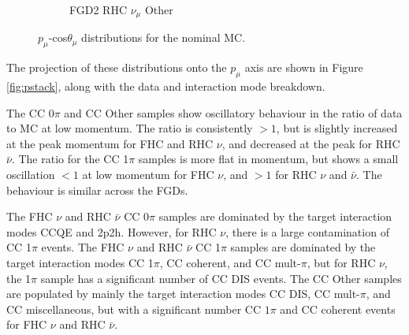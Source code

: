 \begin{figure}
\begin{subfigure}{.32\textwidth}
  \caption{FGD2 RHC $\nu_{\mu}$ Other}
  \label{fig:2d_FGD2_NuMuBkg_CCOther_in_AntiNu_Mode}
\end{subfigure}
\caption{$p_{\mu}$-cos$\theta_{\mu}$ distributions for the nominal MC.}
\label{fig:2dnom}
\end{figure}

The projection of these distributions onto the $p_{\mu}$ axis are shown in Figure \ref{fig:pstack}, along with the data and interaction mode breakdown.

The CC 0$\pi$ and CC Other samples show oscillatory behaviour in the ratio of data to MC at low momentum. The ratio is consistently $>1$, but is slightly increased at the peak momentum for FHC and RHC $\nu$, and decreased at the peak for RHC $\bar{\nu}$. The ratio for the CC 1$\pi$ samples is more flat in momentum, but shows a small oscillation $<1$ at low momentum for FHC $\nu$, and $>1$ for RHC $\nu$ and $\bar{\nu}$. The behaviour is similar across the FGDs.

The FHC $\nu$ and RHC $\bar{\nu}$ CC 0$\pi$ samples are dominated by the target interaction modes CCQE and 2p2h. However, for RHC $\nu$, there is a large contamination of CC 1$\pi$ events. The FHC $\nu$ and RHC $\bar{\nu}$ CC 1$\pi$ samples are dominated by the target interaction modes CC 1$\pi$, CC coherent, and CC mult-$\pi$, but for RHC $\nu$, the 1$\pi$ sample has a significant number of CC DIS events. The CC Other samples are populated by mainly the target interaction modes CC DIS, CC mult-$\pi$, and CC miscellaneous, but with a significant number CC $1\pi$ and CC coherent events for FHC $\nu$ and RHC $\bar{\nu}$.


